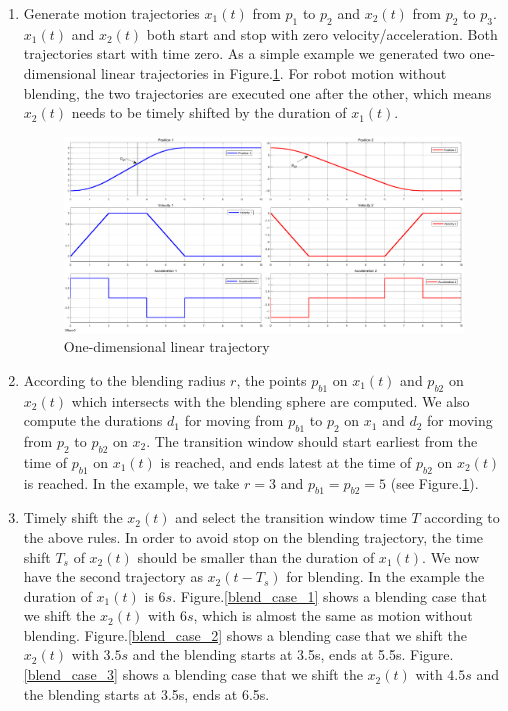 \documentclass{amsart}
\theoremstyle{plain}
\numberwithin{equation}{section}
\begin{document}
\begin{enumerate}
	\item Generate motion trajectories $x_1(t)$ from $p_1$ to $p_2$ and $x_2(t)$ from $p_2$ to $p_3$. $x_1(t)$ and $x_2(t)$ both start and stop with zero velocity/acceleration. Both trajectories start with time zero. As a simple example we generated two one-dimensional linear trajectories in Figure.\ref{ori_traj}. For robot motion without blending, the two trajectories are executed one after the other, which means $x_2(t)$ needs to be timely shifted by the duration of $x_1(t)$.
	\begin{figure}%
	\includegraphics[width=\columnwidth]{figure/original_trajectories.eps}%
	\caption{One-dimensional linear trajectory}%
	\label{ori_traj}%
	\end{figure}

	\item According to the blending radius $r$, the points $p_{b1}$ on $x_1(t)$ and $p_{b2}$ on $x_2(t)$ which intersects with the blending sphere are computed. We also compute the durations $d_1$ for moving from $p_{b1}$ to $p_2$ on $x_1$ and $d_2$ for moving from $p_2$ to $p_{b2}$ on $x_2$. The transition window should start earliest from the time of $p_{b1}$ on $x_1(t)$ is reached, and ends latest at the time of $p_{b2}$ on $x_2(t)$ is reached. In the example, we take $r=3$ and $p_{b1} = p_{b2} = 5$ (see Figure.\ref{ori_traj}).

	\item Timely shift the $x_2(t)$ and select the transition window time $T$ according to the above rules. In order to avoid stop on the blending trajectory, the time shift $T_s$ of $x_2(t)$ should be smaller than the duration of $x_1(t)$. We now have the second trajectory as $x_2(t-T_s)$ for blending. In the example the duration of $x_1(t)$ is $6s$. Figure.\ref{blend_case_1} shows a blending case that we shift the $x_2(t)$ with $6s$, which is almost the same as motion without blending. Figure.\ref{blend_case_2} shows a blending case that we shift the $x_2(t)$ with $3.5s$ and the blending starts at 3.5s, ends at 5.5s. Figure.\ref{blend_case_3} shows a blending case that we shift the $x_2(t)$ with $4.5s$ and the blending starts at 3.5s, ends at 6.5s.


\end{enumerate}
\end{document}
